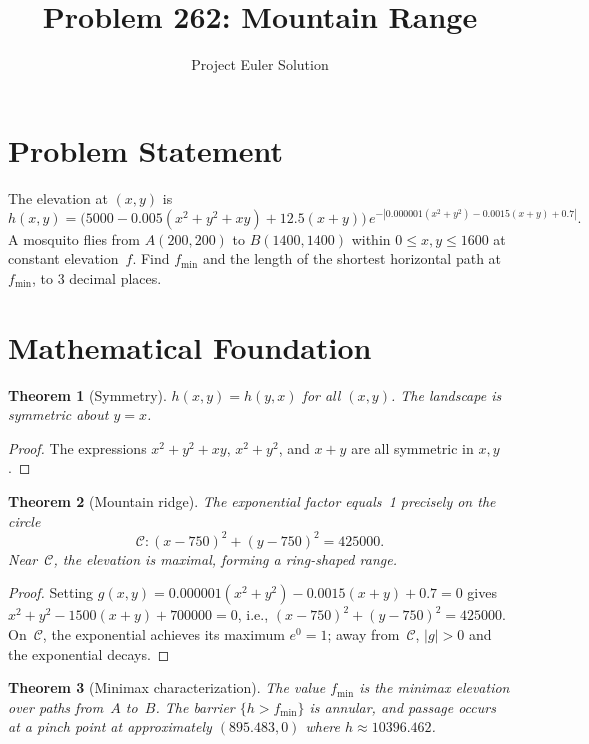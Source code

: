 \documentclass[12pt]{article}
\title{Problem 262: Mountain Range}
\author{Project Euler Solution}
\date{}
\newtheorem{theorem}{Theorem}
\begin{document}
\maketitle

\section{Problem Statement}

The elevation at $(x,y)$ is
\[
h(x,y) = \bigl(5000 - 0.005(x^2{+}y^2{+}xy) + 12.5(x{+}y)\bigr)\,e^{-|0.000001(x^2{+}y^2) - 0.0015(x{+}y) + 0.7|}.
\]
A mosquito flies from $A(200,200)$ to $B(1400,1400)$ within $0\le x,y\le 1600$ at constant elevation~$f$. Find $f_{\min}$ and the length of the shortest horizontal path at~$f_{\min}$, to 3 decimal places.

\section{Mathematical Foundation}

\begin{theorem}[Symmetry]
$h(x,y) = h(y,x)$ for all $(x,y)$. The landscape is symmetric about $y=x$.
\end{theorem}

\begin{proof}
The expressions $x^2+y^2+xy$, $x^2+y^2$, and $x+y$ are all symmetric in $x,y$.
\end{proof}

\begin{theorem}[Mountain ridge]
The exponential factor equals~1 precisely on the circle
\[
\mathcal{C}: (x-750)^2 + (y-750)^2 = 425000.
\]
Near~$\mathcal{C}$, the elevation is maximal, forming a ring-shaped range.
\end{theorem}

\begin{proof}
Setting $g(x,y) = 0.000001(x^2+y^2)-0.0015(x+y)+0.7 = 0$ gives $x^2+y^2-1500(x+y)+700000=0$, i.e., $(x-750)^2+(y-750)^2=425000$. On~$\mathcal{C}$, the exponential achieves its maximum $e^0=1$; away from~$\mathcal{C}$, $|g|>0$ and the exponential decays.
\end{proof}

\begin{theorem}[Minimax characterization]
The value $f_{\min}$ is the minimax elevation over paths from~$A$ to~$B$. The barrier $\{h > f_{\min}\}$ is annular, and passage occurs at a pinch point at approximately $(895.483, 0)$ where $h \approx 10396.462$.
\end{theorem}
\end{document}
